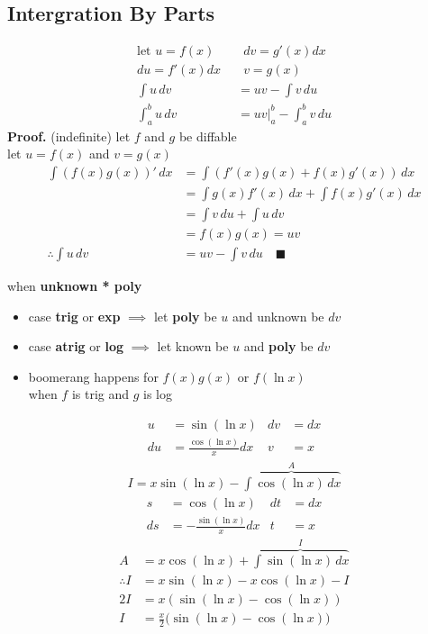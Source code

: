 	\subsection{Intergration By Parts}
	    \begin{theorem}
			\begin{align*}
				\text{let }u=f(x)\enspace&\enspace dv=g'(x)dx\\
				du=f'(x)dx\enspace&\enspace v=g(x)\\
				\int u\,dv&=uv-\int v\,du\\
				\int_a^bu\,dv&=uv\Big|_a^b-\int_a^bv\,du
			\end{align*}
			\textbf{Proof.} (indefinite) let $f$ and $g$ be diffable\\
			let $u=f(x)$ and $v=g(x)$
			\begin{align*}
				\int(f(x)g(x))'\,dx&=\int(f'(x)g(x)+f(x)g'(x))\,dx\tag*{(product rule)}\\
				&=\int g(x)f'(x)\,dx+\int f(x)g'(x)\,dx\tag*{(linearity)}\\
				&=\int v\,du+\int u\,dv\tag*{(premise)}\\
				&=f(x)g(x)=uv\tag*{(def of indef int)}\\
				\therefore\int u\,dv&=uv-\int v\,du\quad\blacksquare
			\end{align*}
	    \end{theorem}
		\begin{algorithm}
			when \textbf{unknown * poly}
			\begin{itemize}
				\item case \textbf{trig} or \textbf{exp} $\implies$ let \textbf{poly} be $u$ and unknown be $dv$
				\item case \textbf{atrig} or \textbf{log} $\implies$ let known be $u$ and \textbf{poly} be $dv$
				\item boomerang happens for $f(x)g(x)$ or $f(\ln x)$\\
					when $f$ is trig and $g$ is log
			\end{itemize}
		\end{algorithm}
		\begin{example}[Boomerange $\displaystyle\int\sin(\ln x)\,dx=I$]
			\begin{align*}
				u&=\sin(\ln x)&dv&=dx\\
				du&=\frac{\cos(\ln x)}xdx&v&=x
			\end{align*}
			\begin{align*}
			    I=x\sin(\ln x)-\overbrace{\int\cos(\ln x)\,dx}^A
			\end{align*}
			\begin{align*}
				s&=\cos(\ln x)&dt&=dx\\
				ds&=-\frac{\sin(\ln x)}xdx&t&=x
			\end{align*}
			\begin{align*}
				A&=x\cos(\ln x)+\overbrace{\int\sin(\ln x)\,dx}^I\\
				\therefore I&=x\sin(\ln x)-x\cos(\ln x)-I\\
				2I&=x(\sin(\ln x)-\cos(\ln x))\\
				I&=\frac x2\Big(\sin(\ln x)-\cos(\ln x)\Big)
			\end{align*}
		\end{example}
